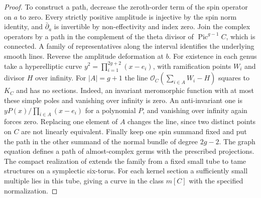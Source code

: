 \begin{proof}
To construct a path, decrease the zeroth-order term of the spin
operator on $a$ to zero. Every strictly positive amplitude is
injective by the spin norm identity, and $\bar\partial_a$ is
invertible by non-effectivity and index zero. Join the complex
operators by a path in the complement of the theta divisor of
$\operatorname{Pic}^{g-1} C$, which is connected. A family of
representatives along the interval identifies the underlying
smooth lines. Reverse the amplitude deformation at $b$.
For existence in each genus take a hyperelliptic curve
$y^2=\prod_{i=1}^{2g+2}(x-e_i)$, with ramification points $W_i$
and divisor $H$ over infinity. For $|A|=g+1$ the line
$\mathcal O_C(\sum_{i\in A}W_i-H)$ squares to $K_C$ and has no
sections. Indeed, an invariant meromorphic function with at most
these simple poles and vanishing over infinity is zero. An
anti-invariant one is $yP(x)/\prod_{i\in A}(x-e_i)$ for a polynomial
$P$, and vanishing over infinity again forces zero. Replacing one
element of $A$ changes the line, since two distinct points on $C$
are not linearly equivalent. Finally keep one spin summand fixed
and put the path in the other summand of the normal bundle of
degree $2g-2$. The graph equation defines a path of almost-complex
germs with the prescribed projections. The compact realization
of \cite[Proposition~3.1 and \S15]{WueUnramified} extends the family from a fixed small
tube to tame structures on a symplectic six-torus. For each kernel
section a sufficiently small multiple lies in this tube, giving
a curve in the class $m[C]$ with the specified normalization.
\end{proof}
